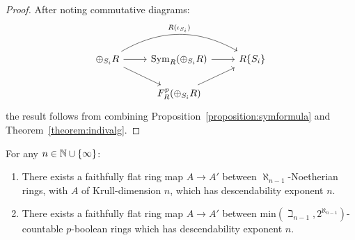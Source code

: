 \begin{proof}
After noting commutative diagrams:
\[\begin{tikzcd} \oplus_{S_i} R \arrow[r] \arrow[rd]\arrow[rr, bend left, "R(\iota_{S_i})"]&  \Sym_R(\oplus_{S_i} R) \arrow[r]& R\{S_i\}\\
& F^p_R(\oplus_{S_i} R) \arrow[ru]&
\end{tikzcd}\]
the result follows from combining Proposition~\ref{proposition:symformula} and Theorem~\ref{theorem:indivalg}.
\end{proof}
\begin{corollary}\label{corollary:mainindiv}
For any $n \in \mathbb{N} \cup \{\infty\}$:
\begin{enumerate}
\item[(i)] There exists a faithfully flat ring map $A \to A'$ between $\aleph_{n-1}$-Noetherian rings, with $A$ of Krull-dimension $n$, which has descendability exponent $n$. 
\item[(ii)] There exists a faithfully flat ring map $A \to A'$ between $\text{min}(\beth_{n-1}, 2^{\aleph_{n-1}})$-countable $p$-boolean rings which has descendability exponent $n$.
\end{enumerate}
\end{corollary}
